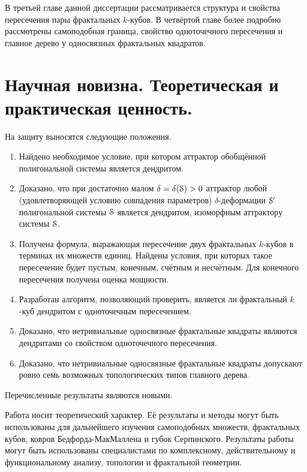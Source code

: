 \documentclass[a5paper,9pt,twoside]{extarticle} %
\begin{document}
В третьей главе данной диссертации рассматривается структура и свойства пересечения пары фрактальных $k$-кубов.
В четвёртой главе более подробно рассмотрены самоподобная граница, свойство одноточечного пересечения и главное дерево у односвязных фрактальных квадратов.


\section{Научная новизна. Теоретическая и практическая ценность.}

На защиту выносятся следующие положения.

\begin{enumerate}
\item Найдено необходимое условие, при котором аттрактор обобщённой полигональной системы является дендритом.

\item Доказано, что при достаточно малом $\delta=\delta({\EuScript S})>0$ аттрактор любой (удовлетворяющей условию совпадения параметров) $\delta$-деформации ${\EuScript S}'$ полигональной системы ${\EuScript S}$ является дендритом, изоморфным аттрактору системы ${\EuScript S}$.

\item Получена формула, выражающая пересечение двух фрактальных $k$-кубов в терминах их множеств единиц.
Найдены условия, при которых такое пересечение будет пустым, конечным, счётным и несчётным.
Для конечного пересечения получена оценка мощности.

\item Разработан алгоритм, позволяющий проверить, является ли фрактальный $k$-куб дендритом с одноточечным пересечением.

\item Доказано, что нетривиальные односвязные фрактальные квадраты являются дендритами со свойством одноточечного пересечения.

\item Доказано, что нетривиальные односвязные фрактальные квадраты допускают ровно семь возможных топологических типов главного дерева.
\end{enumerate}

Перечисленные результаты являются новыми.

Работа носит теоретический характер.
Её результаты и методы могут быть использованы для дальнейшего изучения самоподобных множеств, фрактальных кубов, ковров Бедфорда-МакМаллена и губок Серпинского.
Результаты работы могут быть использованы специалистами по комплексному, действительному и функциональному анализу, топологии и фрактальной геометрии.
\end{document}
